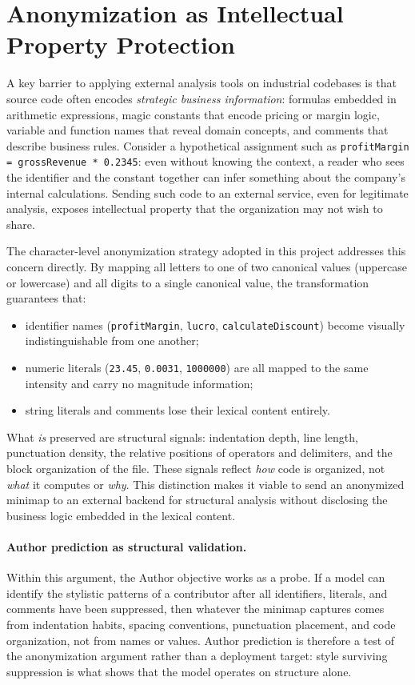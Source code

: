 \section{Anonymization as Intellectual Property Protection}

A key barrier to applying external analysis tools on industrial codebases is
that source code often encodes \textit{strategic business information}: formulas
embedded in arithmetic expressions, magic constants that encode pricing or
margin logic, variable and function names that reveal domain concepts, and
comments that describe business rules. Consider a hypothetical assignment such
as \texttt{profitMargin = grossRevenue * 0.2345}: even without knowing the
context, a reader who sees the identifier and the constant together can infer
something about the company's internal calculations. Sending such code to an
external service, even for legitimate analysis, exposes intellectual property
that the organization may not wish to share.

The character-level anonymization strategy adopted in this project addresses
this concern directly. By mapping all letters to one of two canonical values
(uppercase or lowercase) and all digits to a single canonical value, the
transformation guarantees that:

\begin{itemize}
    \item identifier names (\texttt{profitMargin}, \texttt{lucro},
    \texttt{calculateDiscount}) become visually indistinguishable from one
    another;
    \item numeric literals (\texttt{23.45}, \texttt{0.0031}, \texttt{1000000})
    are all mapped to the same intensity and carry no magnitude information;
    \item string literals and comments lose their lexical content entirely.
\end{itemize}

What \textit{is} preserved are structural signals: indentation depth, line
length, punctuation density, the relative positions of operators and delimiters,
and the block organization of the file. These signals reflect \textit{how}
code is organized, not \textit{what} it computes or \textit{why}. This
distinction makes it viable to send an anonymized minimap to an external backend
for structural analysis without disclosing the business logic embedded in the
lexical content.

\paragraph{Author prediction as structural validation.}
Within this argument, the Author objective works as a probe. If a model can
identify the stylistic patterns of a contributor after all identifiers,
literals, and comments have been suppressed, then whatever the minimap captures
comes from indentation habits, spacing conventions, punctuation placement, and
code organization, not from names or values. Author prediction is therefore a
test of the anonymization argument rather than a deployment target: style
surviving suppression is what shows that the model operates on structure alone.

